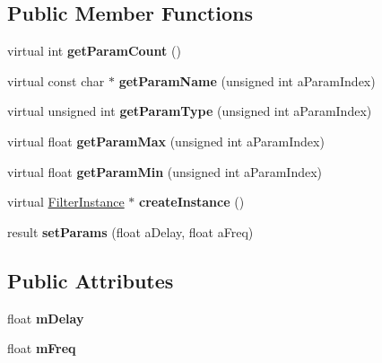 \subsection*{Public Member Functions}
\begin{DoxyCompactItemize}
\item 
\mbox{\label{class_so_loud_1_1_flanger_filter_a82d5fac36edf43db793be771c5d0ffb5}} 
virtual int {\bfseries get\+Param\+Count} ()
\item 
\mbox{\label{class_so_loud_1_1_flanger_filter_a9bd9fd29d1b44a73b2b458ca5b248216}} 
virtual const char $\ast$ {\bfseries get\+Param\+Name} (unsigned int a\+Param\+Index)
\item 
\mbox{\label{class_so_loud_1_1_flanger_filter_aeef0e0ee8297e529e1941fe49ec9c63d}} 
virtual unsigned int {\bfseries get\+Param\+Type} (unsigned int a\+Param\+Index)
\item 
\mbox{\label{class_so_loud_1_1_flanger_filter_ab4e4799fe834df92f63ebdd9c94df949}} 
virtual float {\bfseries get\+Param\+Max} (unsigned int a\+Param\+Index)
\item 
\mbox{\label{class_so_loud_1_1_flanger_filter_ac943ace4874c39d269f2910697975aad}} 
virtual float {\bfseries get\+Param\+Min} (unsigned int a\+Param\+Index)
\item 
\mbox{\label{class_so_loud_1_1_flanger_filter_a036e977382da903380d20271ca2e2165}} 
virtual \mbox{\hyperlink{class_so_loud_1_1_filter_instance}{Filter\+Instance}} $\ast$ {\bfseries create\+Instance} ()
\item 
\mbox{\label{class_so_loud_1_1_flanger_filter_aa483de45fd8458b9365b9012e83c0bd3}} 
result {\bfseries set\+Params} (float a\+Delay, float a\+Freq)
\end{DoxyCompactItemize}
\subsection*{Public Attributes}
\begin{DoxyCompactItemize}
\item 
\mbox{\label{class_so_loud_1_1_flanger_filter_ac86b7178e28c1717c809543e4e574dbe}} 
float {\bfseries m\+Delay}
\item 
\mbox{\label{class_so_loud_1_1_flanger_filter_ac3b426320f3d5666c6924e22afc9b451}} 
float {\bfseries m\+Freq}
\end{DoxyCompactItemize}


